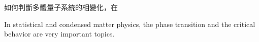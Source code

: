 \begin{abstractzh}
如何判斷多體量子系統的相變化，在
\end{abstractzh}

\begin{abstracten}
In statistical and condensed matter physics, the phase transition and the critical behavior are very important topics.
\end{abstracten}

\begin{comment}
\category{I2.10}{Computing Methodologies}{Artificial Intelligence --
Vision and Scene Understanding} \category{H5.3}{Information
Systems}{Information Interfaces and Presentation (HCI) -- Web-based
Interaction.}

\terms{Design, Human factors, Performance.}

\keywords{matrix product state(MPS), projected entangled pair state(PEPS), projected entangled simplex state, infinite time-evolveing block-decimation, corner transfer matrix, tensor renormalization group, lBenchmarks, uni10.}
\end{comment}
